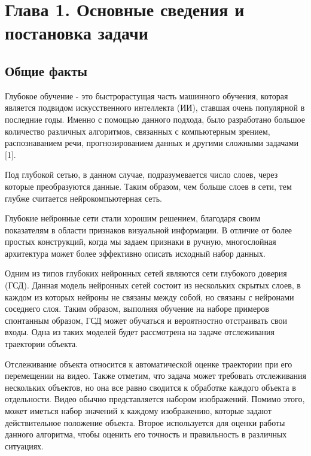 \section*{Глава 1. Основные сведения и постановка задачи}
\setcounter{section}{1}

\subsection{Общие факты}

Глубокое обучение - это быстрорастущая часть машинного обучения, которая является подвидом искусственного интеллекта (ИИ), ставшая очень популярной в последние годы. Именно с помощью данного подхода, было разработано большое количество различных алгоритмов, связанных с компьютерным зрением, распознаванием речи, прогнозированием данных и другими сложными задачами [1].

Под глубокой сетью, в данном случае, подразумевается число слоев, через которые преобразуются данные. Таким образом, чем больше слоев в сети, тем глубже считается нейрокомпьютерная сеть. 

Глубокие нейронные сети стали хорошим решением, благодаря своим показателям в области признаков визуальной информации. В отличие от более простых конструкций, когда мы задаем признаки в ручную, многослойная архитектура может более эффективно описать исходный набор данных.

Одним из типов глубоких нейронных сетей являются сети глубокого доверия (ГСД). Данная модель нейронных сетей состоит из нескольких скрытых слоев, в каждом из которых нейроны не связаны между собой, но связаны с нейронами соседнего слоя. Таким образом, выполняя обучение на наборе примеров спонтанным образом, ГСД может обучаться и вероятностно отстраивать свои входы. Одна из таких моделей будет рассмотрена на задаче отслеживания траектории объекта.

Отслеживание объекта относится к автоматической оценке траектории при его перемещении на видео. Также отметим, что задача может требовать отслеживания нескольких объектов, но она все равно сводится к обработке каждого объекта в отдельности. Видео обычно представляется набором изображений. Помимо этого, может иметься набор значений к каждому изображению, которые задают действительное положение объекта. Второе используется для оценки работы данного алгоритма, чтобы оценить его точность и правильность в различных ситуациях.

